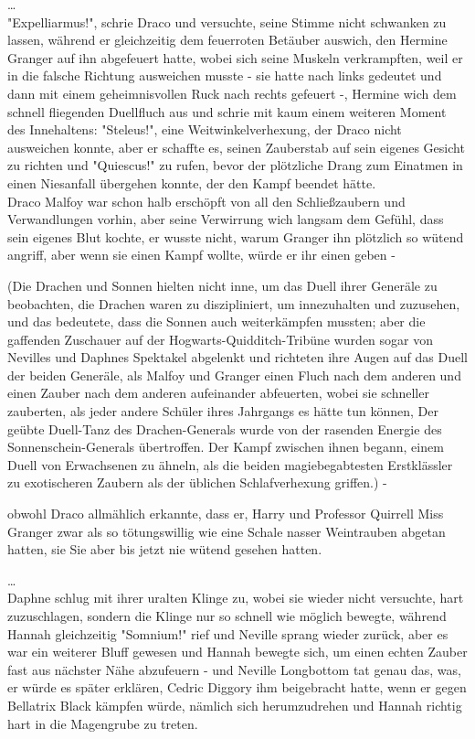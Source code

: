 {…\\ "Expelliarmus!", schrie Draco und versuchte, seine Stimme nicht schwanken zu lassen, während er gleichzeitig dem feuerroten Betäuber auswich, den Hermine Granger auf ihn abgefeuert hatte, wobei sich seine Muskeln verkrampften, weil er in die falsche Richtung ausweichen musste - sie hatte nach links gedeutet und dann mit einem geheimnisvollen Ruck nach rechts gefeuert -, Hermine wich dem schnell fliegenden Duellfluch aus und schrie mit kaum einem weiteren Moment des Innehaltens: "Steleus!", eine Weitwinkelverhexung, der Draco nicht ausweichen konnte, aber er schaffte es, seinen Zauberstab auf sein eigenes Gesicht zu richten und "Quiescus!" zu rufen, bevor der plötzliche Drang zum Einatmen in einen Niesanfall übergehen konnte, der den Kampf beendet hätte.\\ Draco Malfoy war schon halb erschöpft von all den Schließzaubern und Verwandlungen vorhin, aber seine Verwirrung wich langsam dem Gefühl, dass sein eigenes Blut kochte, er wusste nicht, warum Granger ihn plötzlich so wütend angriff, aber wenn sie einen Kampf wollte, würde er ihr einen geben -

(Die Drachen und Sonnen hielten nicht inne, um das Duell ihrer Generäle zu beobachten, die Drachen waren zu diszipliniert, um innezuhalten und zuzusehen, und das bedeutete, dass die Sonnen auch weiterkämpfen mussten; aber die gaffenden Zuschauer auf der Hogwarts-Quidditch-Tribüne wurden sogar von Nevilles und Daphnes Spektakel abgelenkt und richteten ihre Augen auf das Duell der beiden Generäle, als Malfoy und Granger einen Fluch nach dem anderen und einen Zauber nach dem anderen aufeinander abfeuerten, wobei sie schneller zauberten, als jeder andere Schüler ihres Jahrgangs es hätte tun können, Der geübte Duell-Tanz des Drachen-Generals wurde von der rasenden Energie des Sonnenschein-Generals übertroffen. Der Kampf zwischen ihnen begann, einem Duell von Erwachsenen zu ähneln, als die beiden magiebegabtesten Erstklässler zu exotischeren Zaubern als der üblichen Schlafverhexung griffen.) -

obwohl Draco allmählich erkannte, dass er, Harry und Professor Quirrell Miss Granger zwar als so tötungswillig wie eine Schale nasser Weintrauben abgetan hatten, sie Sie aber bis jetzt nie wütend gesehen hatten.

…\\ Daphne schlug mit ihrer uralten Klinge zu, wobei sie wieder nicht versuchte, hart zuzuschlagen, sondern die Klinge nur so schnell wie möglich bewegte, während Hannah gleichzeitig "Somnium!" rief und Neville sprang wieder zurück, aber es war ein weiterer Bluff gewesen und Hannah bewegte sich, um einen echten Zauber fast aus nächster Nähe abzufeuern - und Neville Longbottom tat genau das, was, er würde es später erklären, Cedric Diggory ihm beigebracht hatte, wenn er gegen Bellatrix Black kämpfen würde, nämlich sich herumzudrehen und Hannah richtig hart in die Magengrube zu treten.

}
